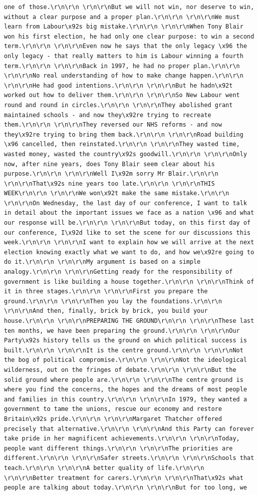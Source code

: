 \documentclass[
  letterpaper,
  DIV=11,
  numbers=noendperiod]{scrreprt}
\begin{document}
\begin{verbatim}
one of those.\r\n\r\n \r\n\r\nBut we will not win, nor deserve to win, without a clear purpose and a proper plan.\r\n\r\n \r\n\r\nWe must learn from Labour\x92s big mistake.\r\n\r\n \r\n\r\nWhen Tony Blair won his first election, he had only one clear purpose: to win a second term.\r\n\r\n \r\n\r\nEven now he says that the only legacy \x96 the only legacy - that really matters to him is Labour winning a fourth term.\r\n\r\n \r\n\r\nBack in 1997, he had no proper plan.\r\n\r\n \r\n\r\nNo real understanding of how to make change happen.\r\n\r\n \r\n\r\nHe had good intentions.\r\n\r\n \r\n\r\nBut he hadn\x92t worked out how to deliver them.\r\n\r\n \r\n\r\nSo New Labour went round and round in circles.\r\n\r\n \r\n\r\nThey abolished grant maintained schools - and now they\x92re trying to recreate them.\r\n\r\n \r\n\r\nThey reversed our NHS reforms - and now they\x92re trying to bring them back.\r\n\r\n \r\n\r\nRoad building \x96 cancelled, then reinstated.\r\n\r\n \r\n\r\nThey wasted time, wasted money, wasted the country\x92s goodwill.\r\n\r\n \r\n\r\nOnly now, after nine years, does Tony Blair seem clear about his purpose.\r\n\r\n \r\n\r\nWell I\x92m sorry Mr Blair.\r\n\r\n \r\n\r\nThat\x92s nine years too late.\r\n\r\n \r\n\r\nTHIS WEEK\r\n\r\n \r\n\r\nWe won\x92t make the same mistake.\r\n\r\n \r\n\r\nOn Wednesday, the last day of our conference, I want to talk in detail about the important issues we face as a nation \x96 and what our response will be.\r\n\r\n \r\n\r\nBut today, on this first day of our conference, I\x92d like to set the scene for our discussions this week.\r\n\r\n \r\n\r\nI want to explain how we will arrive at the next election knowing exactly what we want to do, and how we\x92re going to do it.\r\n\r\n \r\n\r\nMy argument is based on a simple analogy.\r\n\r\n \r\n\r\nGetting ready for the responsibility of government is like building a house together.\r\n\r\n \r\n\r\nThink of it in three stages.\r\n\r\n \r\n\r\nFirst you prepare the ground.\r\n\r\n \r\n\r\nThen you lay the foundations.\r\n\r\n \r\n\r\nAnd then, finally, brick by brick, you build your house.\r\n\r\n \r\n\r\nPREPARING THE GROUND\r\n\r\n \r\n\r\nThese last ten months, we have been preparing the ground.\r\n\r\n \r\n\r\nOur Party\x92s history tells us the ground on which political success is built.\r\n\r\n \r\n\r\nIt is the centre ground.\r\n\r\n \r\n\r\nNot the bog of political compromise.\r\n\r\n \r\n\r\nNot the ideological wilderness, out on the fringes of debate.\r\n\r\n \r\n\r\nBut the solid ground where people are.\r\n\r\n \r\n\r\nThe centre ground is where you find the concerns, the hopes and the dreams of most people and families in this country.\r\n\r\n \r\n\r\nIn 1979, they wanted a government to tame the unions, rescue our economy and restore Britain\x92s pride.\r\n\r\n \r\n\r\nMargaret Thatcher offered precisely that alternative.\r\n\r\n \r\n\r\nAnd this Party can forever take pride in her magnificent achievements.\r\n\r\n \r\n\r\nToday, people want different things.\r\n\r\n \r\n\r\nThe priorities are different.\r\n\r\n \r\n\r\nSafer streets.\r\n\r\n \r\n\r\nSchools that teach.\r\n\r\n \r\n\r\nA better quality of life.\r\n\r\n \r\n\r\nBetter treatment for carers.\r\n\r\n \r\n\r\nThat\x92s what people are talking about today.\r\n\r\n \r\n\r\nBut for too long, we 
\end{verbatim}
\end{document}
